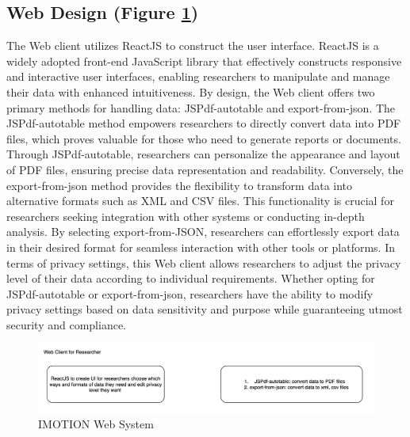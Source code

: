 \documentclass[12pt,two side]{report}
\begin{document}
\subsection{Web Design (Figure \ref{figure:4})}
The Web client utilizes ReactJS to construct the user interface. ReactJS is a widely adopted front-end JavaScript library that effectively constructs responsive and interactive user interfaces, enabling researchers to manipulate and manage their data with enhanced intuitiveness. By design, the Web client offers two primary methods for handling data: JSPdf-autotable and export-from-json. The JSPdf-autotable method empowers researchers to directly convert data into PDF files, which proves valuable for those who need to generate reports or documents. Through JSPdf-autotable, researchers can personalize the appearance and layout of PDF files, ensuring precise data representation and readability. Conversely, the export-from-json method provides the flexibility to transform data into alternative formats such as XML and CSV files. This functionality is crucial for researchers seeking integration with other systems or conducting in-depth analysis. By selecting export-from-JSON, researchers can effortlessly export data in their desired format for seamless interaction with other tools or platforms. In terms of privacy settings, this Web client allows researchers to adjust the privacy level of their data according to individual requirements. Whether opting for JSPdf-autotable or export-from-json, researchers have the ability to modify privacy settings based on data sensitivity and purpose while guaranteeing utmost security and compliance.
\begin{figure}
\centering
\includegraphics[width=16cm]{background_report/figures/web-system.png}
\caption{IMOTION Web System}
\label{figure:4}
\end{figure}
\end{document}
